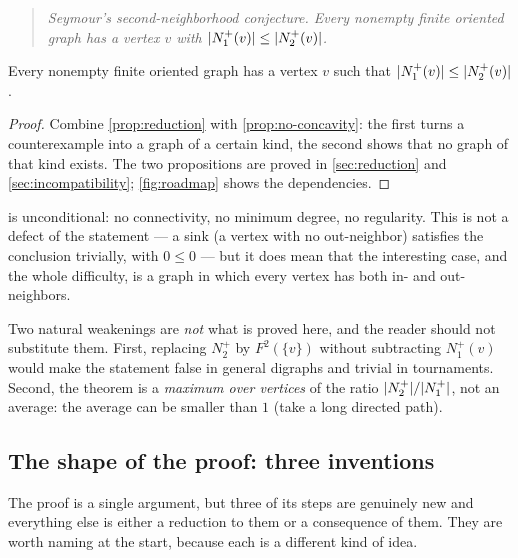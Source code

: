 \begin{quote}\itshape
Seymour's second-neighborhood conjecture. Every nonempty finite oriented graph has a vertex $v$
with $\lvert N_1^+(v)\rvert\le\lvert N_2^+(v)\rvert$.
\end{quote}

\begin{theorem}\label{thm:main}
Every nonempty finite oriented graph has a vertex $v$ such that
$\lvert N_1^+(v)\rvert\le\lvert N_2^+(v)\rvert$.
\end{theorem}


\begin{proof}[Proof]
Combine \cref{prop:reduction} with \cref{prop:no-concavity}: the first turns a counterexample into
a graph of a certain kind, the second shows that no graph of that kind exists. The two propositions
are proved in \cref{sec:reduction} and \cref{sec:incompatibility}; \cref{fig:roadmap} shows the
dependencies.
\end{proof}

 is unconditional: no connectivity, no minimum degree, no regularity. This is not a
defect of the statement --- a sink (a vertex with no out-neighbor) satisfies the conclusion
trivially, with $0\le 0$ --- but it does mean that the interesting case, and the whole difficulty,
is a graph in which every vertex has both in- and out-neighbors.

\begin{warnbox}
Two natural weakenings are \emph{not} what is proved here, and the reader should not substitute
them. First, replacing $N_2^+$ by $F^2(\{v\})$ without subtracting $N_1^+(v)$ would make the
statement false in general digraphs and trivial in tournaments. Second, the theorem is a
\emph{maximum over vertices} of the ratio $\lvert N_2^+\rvert/\lvert N_1^+\rvert$, not an average: the average can
be smaller than $1$ (take a long directed path).
\end{warnbox}

\subsection{The shape of the proof: three inventions}

The proof is a single argument, but three of its steps are genuinely new and everything else is
either a reduction to them or a consequence of them. They are worth naming at the start, because
each is a different kind of idea.

